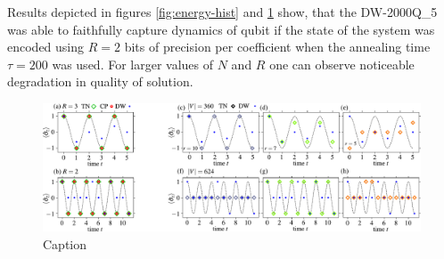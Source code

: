 Results depicted in figures \ref{fig:energy-hist} and \ref{fig:cplex_tn_dwave} show, that the DW-2000Q\_{5} was able to faithfully capture dynamics of qubit if the state of the system was encoded using $R=2$ bits of precision per coefficient when the annealing time $\tau=200$ was used. For larger values of $N$ and $R$ one can observe noticeable degradation in quality of solution.

\begin{figure}
    \centering
    \includegraphics[width=\textwidth]{figures/fig34_merge.pdf}
    \caption{Caption}
    \label{fig:cplex_tn_dwave}
\end{figure}

